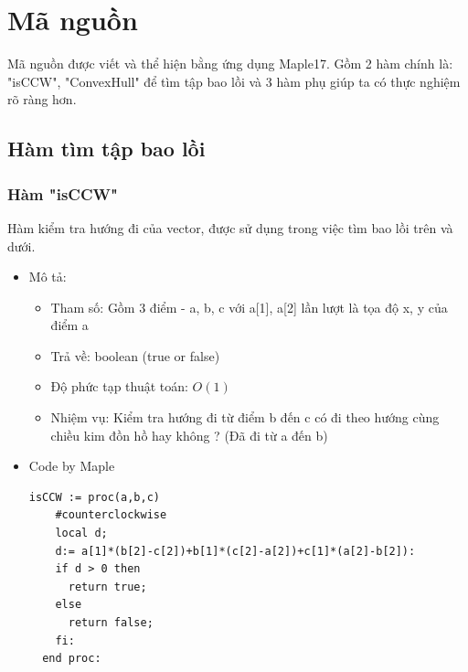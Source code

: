 \documentclass[12pt]{article}
\begin{document}
    \section{Mã nguồn}
      Mã nguồn được viết và thể hiện bằng ứng dụng Maple17. Gồm 2 hàm chính là: "isCCW", "ConvexHull" để tìm tập bao lồi và 3 hàm phụ giúp ta có thực nghiệm rõ ràng hơn.
      \subsection{Hàm tìm tập bao lồi }
      \subsubsection{Hàm "isCCW"}
        Hàm kiểm tra hướng đi của vector, được sử dụng trong việc tìm bao lồi trên và dưới.
        \begin{itemize}
          \item Mô tả:
          \begin{itemize}
            \item Tham số: Gồm 3 điểm - a, b, c với a[1], a[2] lần lượt là tọa độ x, y của điểm a 
            \item Trả về: boolean (true or false)
            \item Độ phức tạp thuật toán: $O(1)$
            \item Nhiệm vụ: Kiểm tra hướng đi từ điểm b đến c có đi theo hướng cùng chiều kim đồn hồ hay không ? (Đã đi từ a đến b)
          \end{itemize}
        \item Code by Maple 
        \begin{Verbatim}[frame=single]
  isCCW := proc(a,b,c)
    #counterclockwise
    local d;
    d:= a[1]*(b[2]-c[2])+b[1]*(c[2]-a[2])+c[1]*(a[2]-b[2]):
    if d > 0 then 
      return true; 
    else 
      return false; 
    fi:
  end proc:
        \end{Verbatim}
      \end{itemize}
        \newpage
\end{document}
